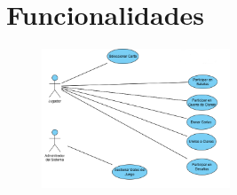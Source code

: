 %
%
%
%
\section{Funcionalidades}

\begin{figure}[H]
  \centering
  \includegraphics[width=0.5\textwidth]{../images/comic_use_cases.png}
\end{figure}


